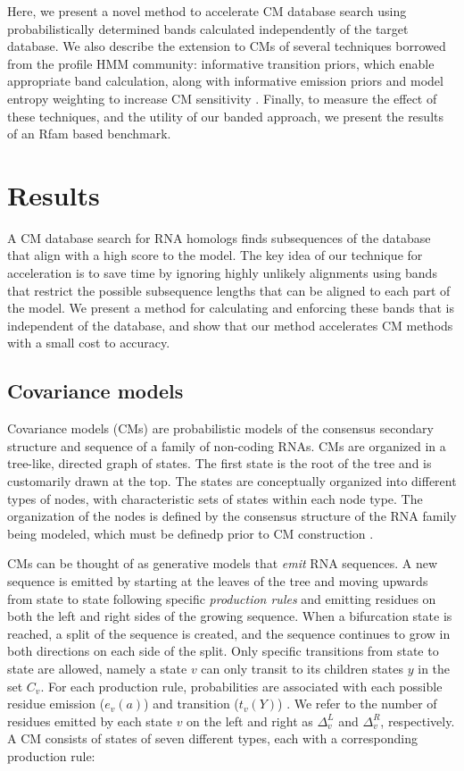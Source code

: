 \documentclass[11pt]{article}
\begin{document}
Here, we present a novel method to accelerate CM 
database search using probabilistically determined bands calculated
independently of the target database. 
We also describe the extension to CMs of
several techniques borrowed from the profile HMM community:
informative transition priors, which enable
appropriate band calculation, along with informative emission priors
and model entropy weighting to increase CM sensitivity . Finally, to
measure the effect of these techniques, and the utility of our
banded approach, we present the results of an Rfam based benchmark.

\section{Results}

A CM database search for RNA homologs finds subsequences 
of the database that align with a high score to the model. 
The key idea of our technique for acceleration is to save time by
ignoring highly unlikely alignments using bands that restrict the
possible subsequence lengths that can be aligned to each part of the model.
We present a method for calculating and enforcing these bands that is
independent of the database, and show that our method accelerates CM
methods with a small cost to accuracy.

\subsection{Covariance models}

Covariance models (CMs) are probabilistic
models of the consensus secondary structure and sequence of a family
of non-coding RNAs. 
CMs are organized in a tree-like, directed
graph of states. The first state is the root of the tree
and is customarily drawn at the top. 
The states are conceptually organized into different types of nodes,
with characteristic sets of states within each node type. The
organization of the nodes is defined by the consensus
structure of the RNA family being modeled, which must be definedp
prior to CM construction \cite{Eddy02b, infguide03}.

CMs can be thought of as generative models that
\emph{emit} RNA sequences.
A new sequence is emitted by starting at
the leaves of the tree and moving upwards from state to state
following specific \emph{production rules} and 
emitting residues on both the left and right sides of the growing
sequence.
When a bifurcation state is reached, a split of the sequence
is created, and the sequence continues to grow in both directions on
each side of the split. Only specific transitions from
state to state are allowed, namely a state $v$ can only transit to
its children states $y$ in the set $C_v$. 
For each production rule, probabilities are associated with each
possible residue emission
($e_v(a)$) and transition ($t_v(Y)$) \cite{Eddy94}. 
We refer to the number of residues emitted by
each state $v$ on the left and right as $\Delta_v^{L}$ and
$\Delta_v^{R}$, respectively. A CM consists of states of seven
different types, each with a corresponding production rule:
\end{document}
